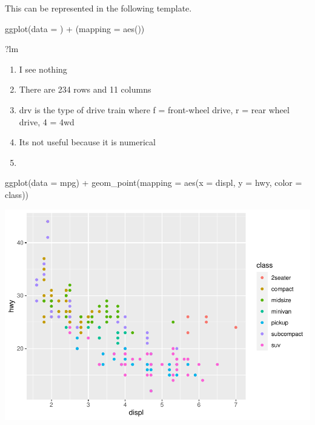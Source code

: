 \documentclass[
]{article}
\newenvironment{Shaded}{\begin{snugshade}}{\end{snugshade}}
\newcommand{\AttributeTok}[1]{\textcolor[rgb]{0.77,0.63,0.00}{#1}}
\newcommand{\FunctionTok}[1]{\textcolor[rgb]{0.00,0.00,0.00}{#1}}
\newcommand{\NormalTok}[1]{#1}
\newcommand{\SpecialCharTok}[1]{\textcolor[rgb]{0.00,0.00,0.00}{#1}}
\begin{document}
This can be represented in the following template.

ggplot(data = ) + (mapping = aes())

\begin{Shaded}
\begin{Highlighting}[]
\NormalTok{?lm}
\end{Highlighting}
\end{Shaded}

\begin{enumerate}
\def\labelenumi{\arabic{enumi}.}
\item
  I see nothing
\item
  There are 234 rows and 11 columns
\item
  drv is the type of drive train where f = front-wheel drive, r = rear
  wheel drive, 4 = 4wd
\item
  Its not useful because it is numerical
\item
\end{enumerate}

\begin{Shaded}
\begin{Highlighting}[]
\FunctionTok{ggplot}\NormalTok{(}\AttributeTok{data =}\NormalTok{ mpg) }\SpecialCharTok{+} 
  \FunctionTok{geom\_point}\NormalTok{(}\AttributeTok{mapping =} \FunctionTok{aes}\NormalTok{(}\AttributeTok{x =}\NormalTok{ displ, }\AttributeTok{y =}\NormalTok{ hwy, }\AttributeTok{color =}\NormalTok{ class))}
\end{Highlighting}
\end{Shaded}

\includegraphics{Journal_files/figure-latex/unnamed-chunk-45-1.pdf}
\end{document}
